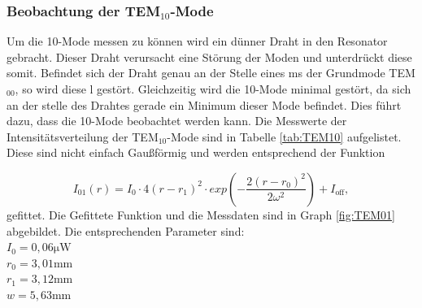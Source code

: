 \subsubsection{Beobachtung der TEM$_{10}$-Mode}
\label{sec:Beobachtung der EINFÜGEN-Mode}
Um die 10-Mode messen zu können wird ein dünner Draht in den Resonator gebracht.
Dieser Draht verursacht eine Störung der Moden und unterdrückt diese somit. Befindet sich der Draht genau an der Stelle eines ms der Grundmode TEM$_{00}$, so wird diese l gestört.
Gleichzeitig wird die 10-Mode minimal gestört, da sich an der stelle des Drahtes gerade ein Minimum dieser Mode befindet. Dies führt dazu, dass die 10-Mode beobachtet werden kann.
Die Messwerte der Intensitätsverteilung der TEM$_{10}$-Mode sind in Tabelle \ref{tab:TEM10} aufgelistet. Diese sind nicht einfach Gaußförmig und werden entsprechend der Funktion

\begin{equation}
  I_{01}(r) = I_0 \cdot 4 (r - r_1)^2 \cdot exp \left( - \frac{2 (r - r_0)^2}{2 \omega^2}\right) + I_{\text{off}},
\end{equation}
gefittet. Die Gefittete Funktion und die Messdaten sind in Graph \ref{fig:TEM01} abgebildet.
Die entsprechenden Parameter sind: \\
$I_0 = 0,06 \si{\micro\watt}$ \\
$r_0 = 3,01 \si{\milli\meter}$ \\
$r_1 = 3,12 \si{\milli\meter}$ \\
$w = 5,63 \si{\milli\meter}$ \\



